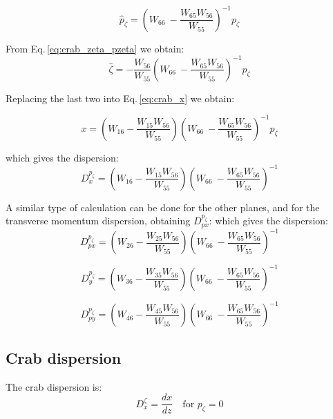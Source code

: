 \begin{equation}
  \hat{p}_\zeta = \left( W_{66}\ -  \frac{W_{65}W_{56}}{W_{55}} \right)^{-1}p_\zeta
\end{equation}

From Eq.\,\ref{eq:crab_zeta_pzeta} we obtain:
\begin{equation}
\hat{\zeta} = - \frac{W_{56}}{W_{55}}\left( W_{66}\ -  \frac{W_{65}W_{56}}{W_{55}} \right)^{-1} p_\zeta
\end{equation}

Replacing the last two into Eq.\,\ref{eq:crab_x} we obtain:

\begin{equation}
x = \left(W_{16} -\frac{W_{15}W_{56}}{W_{55}}\right)\left( W_{66}\ -  \frac{W_{65}W_{56}}{W_{55}} \right)^{-1} p_\zeta
\end{equation}

which gives the dispersion:
\begin{equation}
D_{x}^{p_\zeta} = \left(W_{16} -\frac{W_{15}W_{56}}{W_{55}}\right)\left( W_{66}\ -  \frac{W_{65}W_{56}}{W_{55}} \right)^{-1}
\end{equation}

A similar type of calculation can be done for the other planes, and for the transverse momentum dispersion, obtaining $D_{px}^{p_\zeta}$:
which gives the dispersion:
\begin{equation}
D_{px}^{p_\zeta} = \left(W_{26} -\frac{W_{25}W_{56}}{W_{55}}\right)\left( W_{66}\ -  \frac{W_{65}W_{56}}{W_{55}} \right)^{-1}
\end{equation}

\begin{equation}
D_{y}^{p_\zeta} = \left(W_{36} -\frac{W_{35}W_{56}}{W_{55}}\right)\left( W_{66}\ -  \frac{W_{65}W_{56}}{W_{55}} \right)^{-1}
\end{equation}

\begin{equation}
D_{py}^{p_\zeta} = \left(W_{46} -\frac{W_{45}W_{56}}{W_{55}}\right)\left( W_{66}\ -  \frac{W_{65}W_{56}}{W_{55}} \right)^{-1}
\end{equation}

\subsection{Crab dispersion}

The crab dispersion is:
\begin{equation}
D_x^\zeta = \frac{dx}{dz} \quad \text{for } p_\zeta=0
\end{equation}

